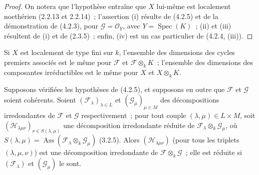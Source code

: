 \begin{proof}
On notera que l'hypothèse entraîne que $X$ lui-même est localement noethérien
(2.2.13 et 2.2.14)~; l'assertion (i) résulte de (4.2.5) et de la démonstration
de (4.2.3), pour $\mathcal G=\mathcal O_Y$, avec
$Y=\operatorname{Spec}(K)$~; (ii) et (iii) résultent de (i) et de (2.3.5)~;
enfin, (iv) est un cas particulier de (4.2.4, (iii)).
\end{proof}

\begin{corollary}[4.2.8]
\label{IV.2.4.2.8-fr}
Si $X$ est localement de type fini sur $k$, l'ensemble des dimensions des
cycles premiers associés est le même pour $\mathcal F$ et
$\mathcal F\otimes_k K$~; l'ensemble des dimensions des composantes
irréductibles est le même pour $X$ et $X\otimes_k K$.
\end{corollary}

\begin{proposition}[4.2.9]
\label{IV.2.4.2.9-fr}
Supposons vérifiées les hypothèses de \textup{(4.2.5)}, et supposons en outre que
$\mathcal F$ et $\mathcal G$ soient cohérents. Soient
$(\mathcal F_\lambda)_{\lambda\in L}$ et
$(\mathcal G_\mu)_{\mu\in M}$ des décompositions irredondantes de
$\mathcal F$ et $\mathcal G$ respectivement~; pour tout couple
$(\lambda,\mu)\in L\times M$, soit
$(\mathcal H_{\lambda\mu\nu})_{\nu\in S(\lambda,\mu)}$ une décomposition
irredondante réduite de $\mathcal F_\lambda\otimes_k\mathcal G_\mu$, où
$S(\lambda,\mu)=\operatorname{Ass}(\mathcal F_\lambda\otimes_k\mathcal G_\mu)$
\textup{(3.2.5)}. Alors $(\mathcal H_{\lambda\mu\nu})$ \textup{(}pour tous les triplets
$(\lambda,\mu,\nu)$\textup{)} est une décomposition irredondante de
$\mathcal F\otimes_k\mathcal G$~; elle est réduite si
$(\mathcal F_\lambda)$ et $(\mathcal G_\mu)$ le sont.
\end{proposition}

